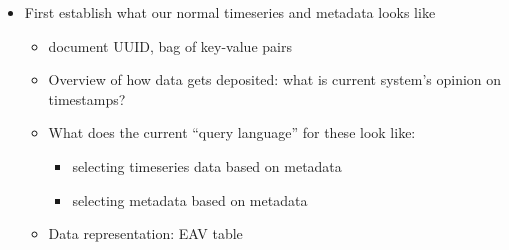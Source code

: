 \begin{itemize}
\item First establish what our normal timeseries and metadata looks like
  \begin{itemize}
  \item document UUID, bag of key-value pairs
  \item Overview of how data gets deposited: what is current system's opinion on timestamps?
  \item What does the current ``query language'' for these look like:
      \begin{itemize}
      \item selecting timeseries data based on metadata
      \item selecting metadata based on metadata
      \end{itemize}
  \item Data representation: EAV table
  \end{itemize}
\end{itemize}
